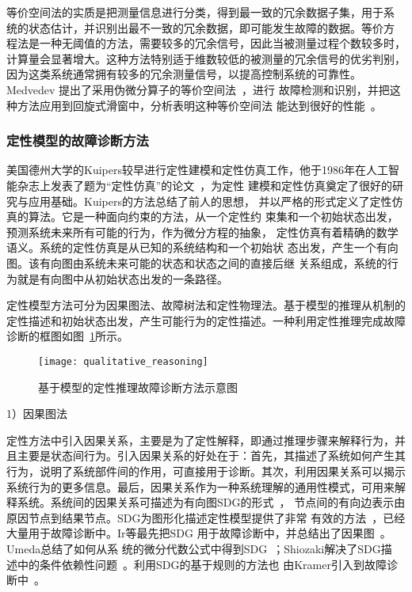 等价空间法的实质是把测量信息进行分类，得到最一致的冗余数据子集，用于系
统的状态估计，并识别出最不一致的冗余数据，即可能发生故障的数据。等价方
程法是一种无阈值的方法，需要较多的冗余信号，因此当被测量过程个数较多时，
计算量会显著增大。这种方法特别适于维数较低的被测量的冗余信号的优劣判别，
因为这类系统通常拥有较多的冗余测量信号，以提高控制系统的可靠性。Medvedev
提出了采用伪微分算子的等价空间法~\cite{medvedev1997disturbance}，进行
故障检测和识别，并把这种方法应用到回旋式滑窗中，分析表明这种等价空间法
能达到很好的性能~\cite{magni1994residual}。

\subsubsection{定性模型的故障诊断方法}

美国德州大学的Kuipers较早进行定性建模和定性仿真工作，他于1986年在人工智
能杂志上发表了题为“定性仿真”的论文~\cite{kuipers1986qualitative}，为定性
建模和定性仿真奠定了很好的研究与应用基础。Kuipers的方法总结了前人的思想，
并以严格的形式定义了定性仿真的算法。它是一种面向约束的方法，从一个定性约
束集和一个初始状态出发，预测系统未来所有可能的行为，作为微分方程的抽象，
定性仿真有着精确的数学语义。系统的定性仿真是从已知的系统结构和一个初始状
态出发，产生一个有向图。该有向图由系统未来可能的状态和状态之间的直接后继
关系组成，系统的行为就是有向图中从初始状态出发的一条路径\cite{forbus1984qualitative, forbus1991qualitative, williams1991qualitative}。

定性模型方法可分为因果图法、故障树法和定性物理法。基于模型的推理从机制的
定性描述和初始状态出发，产生可能行为的定性描述。一种利用定性推理完成故障
诊断的框图如图~\ref{fig:qualitative_reasoning}所示。
\begin{figure}[ht]
  \centering
  \texttt{[image: qualitative\_reasoning]}
  \caption{基于模型的定性推理故障诊断方法示意图}
  \label{fig:qualitative_reasoning}
\end{figure}

1）因果图法 

定性方法中引入因果关系，主要是为了定性解释，即通过推理步骤来解释行为，并
且主要是状态间行为。引入因果关系的好处在于：首先，其描述了系统如何产生其
行为，说明了系统部件间的作用，可直接用于诊断。其次，利用因果关系可以揭示
系统行为的更多信息。最后，因果关系作为一种系统理解的通用性模式，可用来解
释系统。系统间的因果关系可描述为有向图SDG的形式~\cite{forbus1984qualitative, forbus1991qualitative, williams1991qualitative}，
节点间的有向边表示由原因节点到结果节点。SDG为图形化描述定性模型提供了非常
有效的方法~\cite{tarifa2004fault}，已经大量用于故障诊断中。Ir等最先把SDG
用于故障诊断中，并总结出了因果图~\cite{zhang2005sdg}。Umeda总结了如何从系
统的微分代数公式中得到SDG~\cite{umeda1980graphical}；Shiozaki解决了SDG描
述中的条件依赖性问题~\cite{shiozaki1985fault}。利用SDG的基于规则的方法也
由Kramer引入到故障诊断中~\cite{kramer1987rule}。

